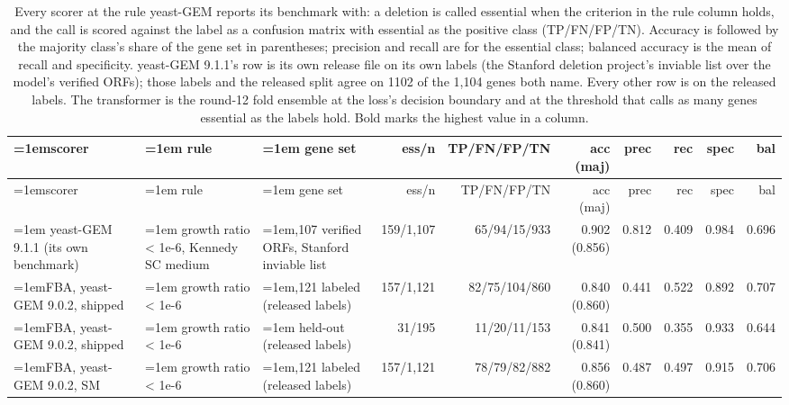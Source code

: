 \begingroup
\scriptsize
  \setlength{\tabcolsep}{2.5pt}
\begin{longtable}{@{}>{\raggedright\hangindent=1em\hangafter=1\arraybackslash}p{29.9mm}>{\raggedright\hangindent=1em\hangafter=1\arraybackslash}p{28.0mm}>{\raggedright\hangindent=1em\hangafter=1\arraybackslash}p{28.0mm}rrrrrrr@{}}
  \caption[Every scorer at yeast-GEM's rule]{Every scorer at the rule yeast-GEM reports its benchmark with: a deletion is called essential when the criterion in the rule column holds, and the call is scored against the label as a confusion matrix with essential as the positive class (TP/FN/FP/TN). Accuracy is followed by the majority class's share of the gene set in parentheses; precision and recall are for the essential class; balanced accuracy is the mean of recall and specificity. yeast-GEM 9.1.1's row is its own release file on its own labels (the Stanford deletion project's inviable list over the model's verified ORFs); those labels and the released split agree on 1102 of the 1,104 genes both name. Every other row is on the released labels. The transformer is the round-12 fold ensemble at the loss's decision boundary and at the threshold that calls as many genes essential as the labels hold. Bold marks the highest value in a column.}
  \label{tab:confusion}\\
    \hline
    scorer & rule & gene set & ess/n & TP/FN/FP/TN & acc (maj) & prec & rec & spec & bal \\
    \hline
  \endfirsthead
    \hline
    scorer & rule & gene set & ess/n & TP/FN/FP/TN & acc (maj) & prec & rec & spec & bal \\
    \hline
  \endhead
    \hline
  \endfoot
    \hline
  \endlastfoot
    yeast-GEM 9.1.1 (its own benchmark) & growth ratio < 1e-6, Kennedy SC medium & 1,107 verified ORFs, Stanford inviable list & 159/1,107 & 65/94/15/933 & 0.902 (0.856) & 0.812 & 0.409 & 0.984 & 0.696 \\
    FBA, yeast-GEM 9.0.2, shipped & growth ratio < 1e-6 & 1,121 labeled (released labels) & 157/1,121 & 82/75/104/860 & 0.840 (0.860) & 0.441 & 0.522 & 0.892 & 0.707 \\
    FBA, yeast-GEM 9.0.2, shipped & growth ratio < 1e-6 & 195 held-out (released labels) & 31/195 & 11/20/11/153 & 0.841 (0.841) & 0.500 & 0.355 & 0.933 & 0.644 \\
    FBA, yeast-GEM 9.0.2, SM & growth ratio < 1e-6 & 1,121 labeled (released labels) & 157/1,121 & 78/79/82/882 & 0.856 (0.860) & 0.487 & 0.497 & 0.915 & 0.706 \\

\end{longtable}
